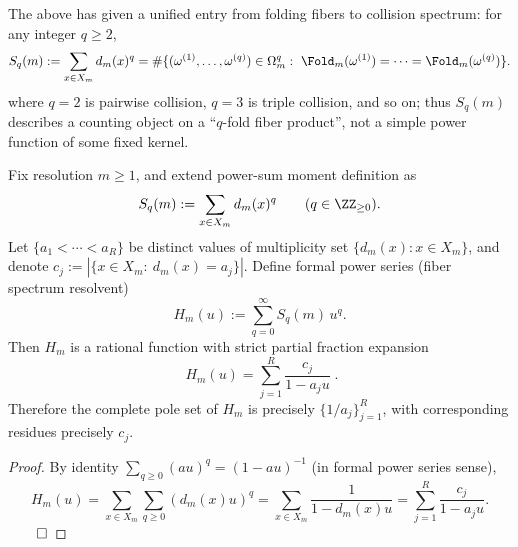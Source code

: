\label{subsubsec:pom-collision-kernel-family}
The above has given a unified entry from folding fibers to collision spectrum:
for any integer \(q\ge 2\),
\[
S_q(m):=\sum_{x\in X_m}d_m(x)^q
=\#\{(\omega^{(1)},\dots,\omega^{(q)})\in\Omega_m^q:\ \Fold_m(\omega^{(1)})=\cdots=\Fold_m(\omega^{(q)})\}.
\]
where \(q=2\) is pairwise collision, \(q=3\) is triple collision, and so on; thus \(S_q(m)\) describes a counting object on a ``\(q\)-fold fiber product'', not a simple power function of some fixed kernel.
\par


\begin{theorem}\label{thm:pom-fiber-spectrum-resolvent-rational}
Fix resolution \(m\ge 1\), and extend power-sum moment definition as
\[
S_q(m):=\sum_{x\in X_m} d_m(x)^q\qquad(q\in\ZZ_{\ge 0}).
\]
Let \(\{a_1<\cdots<a_R\}\) be distinct values of multiplicity set \(\{d_m(x):x\in X_m\}\), and denote
\(
c_j:=|\{x\in X_m:\ d_m(x)=a_j\}|
\).
Define formal power series (fiber spectrum resolvent)
\[
H_m(u):=\sum_{q=0}^{\infty} S_q(m)\,u^q.
\]
Then \(H_m\) is a rational function with strict partial fraction expansion
\[
\boxed{\;
H_m(u)=\sum_{j=1}^{R}\frac{c_j}{1-a_j u}\; }.
\]
Therefore the complete pole set of \(H_m\) is precisely \(\{1/a_j\}_{j=1}^{R}\), with corresponding residues precisely \(c_j\).
\end{theorem}
\begin{proof}
By identity \(\sum_{q\ge 0}(au)^q=(1-au)^{-1}\) (in formal power series sense),
\[
H_m(u)=\sum_{x\in X_m}\sum_{q\ge 0}(d_m(x)u)^q
=\sum_{x\in X_m}\frac{1}{1-d_m(x)u}
=\sum_{j=1}^{R}\frac{c_j}{1-a_j u}.
\]
$\qed$
\end{proof}

